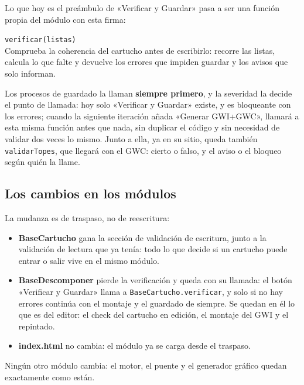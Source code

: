 Lo que hoy es el preámbulo de «Verificar y Guardar» pasa a ser
una función propia del módulo con esta firma:

		
\begin{description}
	\item \texttt{verificar(listas)} \\
	Comprueba la coherencia del cartucho antes de escribirlo: recorre las listas, calcula lo que falte y devuelve los errores que impiden guardar y los avisos que solo informan.
\end{description}


Los procesos de guardado la llaman \textbf{siempre primero}, y la
severidad la decide el punto de llamada: hoy solo «Verificar y
Guardar» existe, y es bloqueante con los errores; cuando la
siguiente iteración añada «Generar GWI+GWC», llamará a esta
misma función antes que nada, sin duplicar el código y sin necesidad de validar dos
veces lo mismo. Junto a ella, ya en su sitio, queda también
\texttt{validarTopes}, que llegará con el GWC: cierto o falso, y
el aviso o el bloqueo según quién la llame.

\subsection{Los cambios en los módulos}
\label{sec:F5I5Cambios}

La mudanza es de traspaso, no de reescritura:

\begin{itemize}
	\item \textbf{BaseCartucho} gana la sección de validación de
	escritura, junto a la validación de lectura que ya tenía: todo
	lo que decide si un cartucho puede entrar o salir vive en el
	mismo módulo.
	
	\item \textbf{BaseDescomponer} pierde la verificación y queda
	con su llamada: el botón «Verificar y Guardar» llama a
	\texttt{BaseCartucho.verificar}, y solo si no hay errores
	continúa con el montaje y el guardado de siempre. Se quedan en
	él lo que es del editor: el check del cartucho en edición, el
	montaje del GWI y el repintado.
	
	\item \textbf{index.html} no cambia: el módulo ya se carga
	desde el traspaso.
\end{itemize}

Ningún otro módulo cambia: el motor, el puente y el generador
gráfico quedan exactamente como están.

